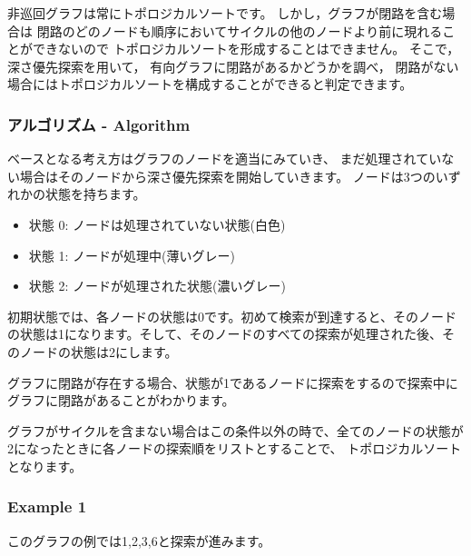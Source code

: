 非巡回グラフは常にトポロジカルソートです。
しかし，グラフが閉路を含む場合は
閉路のどのノードも順序においてサイクルの他のノードより前に現れることができないので
トポロジカルソートを形成することはできません。
そこで，深さ優先探索を用いて，
有向グラフに閉路があるかどうかを調べ，
閉路がない場合にはトポロジカルソートを構成することができると判定できます。

\subsubsection{アルゴリズム - Algorithm}

ベースとなる考え方はグラフのノードを適当にみていき、
まだ処理されていない場合はそのノードから深さ優先探索を開始していきます。
ノードは3つのいずれかの状態を持ちます。

\begin{itemize}
\item 状態 0: ノードは処理されていない状態(白色)
\item 状態 1: ノードが処理中(薄いグレー)
\item 状態 2: ノードが処理された状態(濃いグレー)
\end{itemize}

初期状態では、各ノードの状態は0です。初めて検索が到達すると、そのノードの状態は1になります。そして、そのノードのすべての探索が処理された後、そのノードの状態は2にします。

グラフに閉路が存在する場合、状態が1であるノードに探索をするので探索中にグラフに閉路があることがわかります。

グラフがサイクルを含まない場合はこの条件以外の時で、全てのノードの状態が2になったときに各ノードの探索順をリストとすることで、
トポロジカルソートとなります。

\subsubsection{Example 1}

このグラフの例では1,2,3,6と探索が進みます。

\begin{center}
\end{center}


